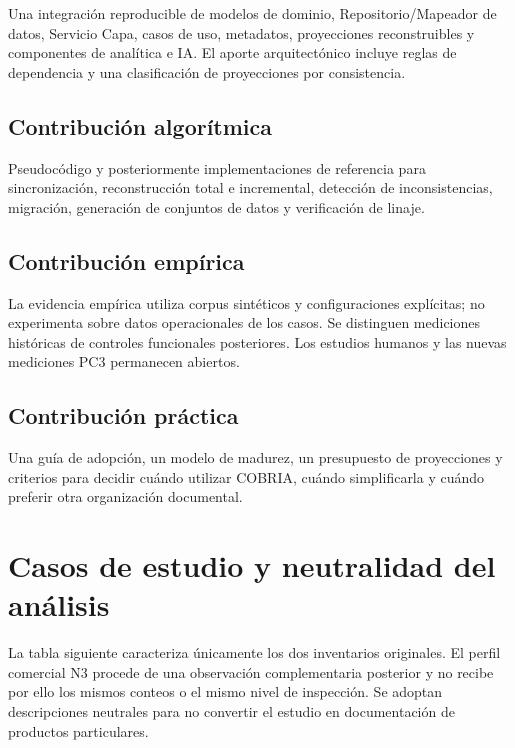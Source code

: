 Una integración reproducible de modelos de dominio, Repositorio/Mapeador de datos, Servicio
Capa, casos de uso, metadatos, proyecciones reconstruibles y componentes de analítica e
IA. El aporte arquitectónico incluye reglas de dependencia y una clasificación de
proyecciones por consistencia.

\subsection{Contribución algorítmica}

Pseudocódigo y posteriormente implementaciones de referencia para sincronización,
reconstrucción total e incremental, detección de inconsistencias, migración, generación
de conjuntos de datos y verificación de linaje.

\subsection{Contribución empírica}

La evidencia empírica utiliza corpus sintéticos y configuraciones explícitas; no
experimenta sobre datos operacionales de los casos. Se distinguen mediciones
históricas de controles funcionales posteriores. Los estudios humanos y las nuevas
mediciones PC3 permanecen abiertos.

\subsection{Contribución práctica}

Una guía de adopción, un modelo de madurez, un presupuesto de proyecciones y criterios
para decidir cuándo utilizar COBRIA, cuándo simplificarla y cuándo preferir otra
organización documental.

\section{Casos de estudio y neutralidad del análisis}

\COBRIAPerfilesCientificos
La tabla siguiente caracteriza únicamente los dos inventarios originales. El perfil
comercial N3 procede de una observación complementaria posterior y no recibe por ello
los mismos conteos o el mismo nivel de inspección. Se adoptan descripciones neutrales
para no convertir el estudio en documentación de productos particulares.

